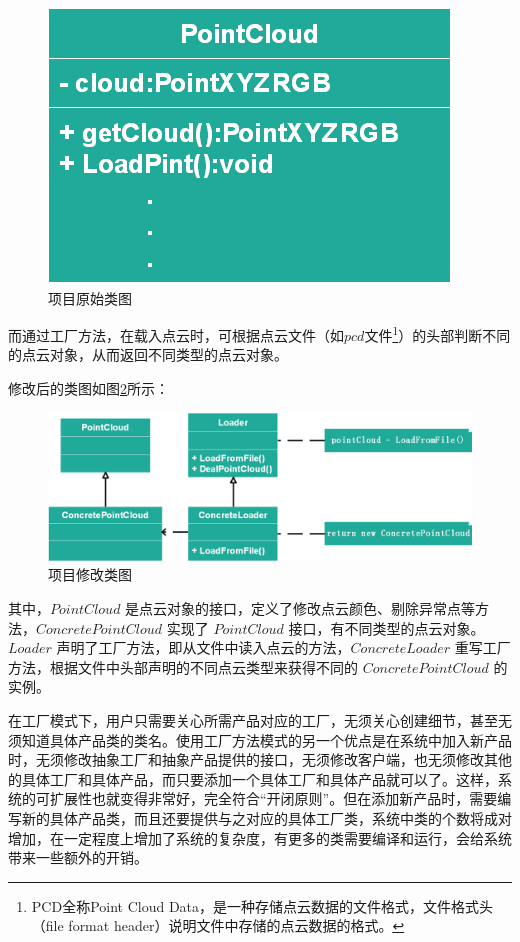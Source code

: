 \documentclass[article]{BJTU-thesis}
\begin{document}
\begin{figure}[!htbp]
	\centering
	\includegraphics[scale=0.5]{16.png}
	\caption{项目原始类图}
	\label{fig:fig6}
\end{figure}

而通过工厂方法，在载入点云时，可根据点云文件（如$pcd$文件\footnote{PCD全称Point Cloud Data，是一种存储点云数据的文件格式，文件格式头（file format header）说明文件中存储的点云数据的格式。}）的头部判断不同的点云对象，从而返回不同类型的点云对象。

修改后的类图如图\ref{fig:fig7}所示：

\begin{figure}[!htbp]
	\centering
	\includegraphics[scale=0.5]{17.png}
	\caption{项目修改类图}
		\label{fig:fig7}
\end{figure}

其中，$PointCloud$ 是点云对象的接口，定义了修改点云颜色、剔除异常点等方法，$ConcretePointCloud$ 实现了 $PointCloud$ 接口，有不同类型的点云对象。$Loader$ 声明了工厂方法，即从文件中读入点云的方法，$ConcreteLoader$ 重写工厂方法，根据文件中头部声明的不同点云类型来获得不同的 $ConcretePointCloud$ 的实例。

在工厂模式下，用户只需要关心所需产品对应的工厂，无须关心创建细节，甚至无须知道具体产品类的类名。使用工厂方法模式的另一个优点是在系统中加入新产品时，无须修改抽象工厂和抽象产品提供的接口，无须修改客户端，也无须修改其他的具体工厂和具体产品，而只要添加一个具体工厂和具体产品就可以了。这样，系统的可扩展性也就变得非常好，完全符合“开闭原则”。但在添加新产品时，需要编写新的具体产品类，而且还要提供与之对应的具体工厂类，系统中类的个数将成对增加，在一定程度上增加了系统的复杂度，有更多的类需要编译和运行，会给系统带来一些额外的开销。
	
\end{document}
